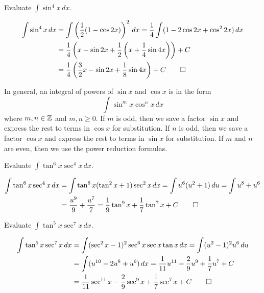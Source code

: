 \begin{problem}
    Evaluate \(\displaystyle{\int\sin^4 x\,dx}\).
\end{problem}
\begin{solution}
    \begin{align*}
        \int\sin^4 x\,dx &= \int\left(\frac{1}{2}(1-\cos 2x)\right)^2\,dx
        =\frac{1}{4}\int(1-2\cos 2x+\cos^2 2x)\,dx \\
        &= \frac{1}{4}
        \left(x-\sin 2x+\frac{1}{2}
        \left(x+\frac{1}{4}\sin 4x\right)\right)+C \\
        &= \frac{1}{4}
        \left(\frac{3}{2}x-\sin 2x+\frac{1}{8}\sin 4x\right)+C \qedhere
    \end{align*}
\end{solution}
In general, an integral of powers of \(\sin x\) and \(\cos x\) is in the
form
\[\int\sin^m x\cos^n x\,dx\]
where \(m,n\in\mathbb{Z}\) and \(m,n\geq 0\).
If \(m\) is odd, then we save a factor \(\sin x\) and express the rest to
terms in \(\cos x\) for substitution.
If \(n\) is odd, then we save a factor \(\cos x\) and express the rest to
terms in \(\sin x\) for substitution.
If \(m\) and \(n\) are even, then we use the power reduction formulas.
\begin{problem}
    Evaluate \(\displaystyle{\int\tan^6 x\sec^4 x\,dx}\).
\end{problem}
\begin{solution}
    \begin{align*}
        \int\tan^6 x\sec^4 x\,dx &= \int\tan^6 x(\tan^2 x+1)\sec^2 x\,dx
        =\int u^6(u^2+1)\,du=\int u^8+u^6 \\
        & =\frac{u^9}{9}+\frac{u^7}{7}
        =\frac{1}{9}\tan^9 x+\frac{1}{7}\tan^7 x+C \qedhere
    \end{align*}
\end{solution}
\begin{problem}
    Evaluate \(\displaystyle{\int\tan^5 x\sec^7 x\,dx}\).
\end{problem}
\begin{solution}
    \begin{align*}
        \int\tan^5 x\sec^7 x\,dx
        &= \int(\sec^2 x-1)^2\sec^6 x\sec x\tan x\,dx
        =\int(u^2-1)^2u^6\,du \\
        &= \int(u^{10}-2u^8+u^6)\,dx
        =\frac{1}{11}u^{11}-\frac{2}{9}u^9+\frac{1}{7}u^7+C \\
        &= \frac{1}{11}\sec^{11}x-\frac{2}{9}\sec^9 x+\frac{1}{7}\sec^7 x
        +C \qedhere
    \end{align*}
\end{solution}
